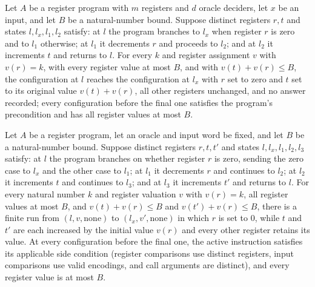 \begin{theorem}
\label{Complexity.LogProg.move_run}
\leanok
{}
Let $A$ be a register program with $m$ registers and $d$ oracle deciders, let $x$ be an
input, and let $B$ be a natural-number bound. Suppose distinct registers $r,t$ and
states $l,l_x,l_1,l_2$ satisfy: at $l$ the program branches to $l_x$ when register $r$
is zero and to $l_1$ otherwise; at $l_1$ it decrements $r$ and proceeds to $l_2$; and at
$l_2$ it increments $t$ and returns to $l$. For every $k$ and register assignment $v$
with $v(r)=k$, with every register value at most $B$, and with $v(t)+v(r)\le B$, the
configuration at $l$ reaches the configuration at $l_x$ with $r$ set to zero and $t$ set
to its original value $v(t)+v(r)$, all other registers unchanged, and no answer
recorded; every configuration before the final one satisfies the program's precondition
and has all register values at most $B$.
\end{theorem}

\begin{theorem}
\label{Complexity.LogProg.move2_run}
\leanok
{}
Let $A$ be a register program, let an oracle and input word be fixed, and let $B$ be a
natural-number bound. Suppose distinct registers $r,t,t'$ and states $l,l_x,l_1,l_2,l_3$
satisfy: at $l$ the program branches on whether register $r$ is zero, sending the zero
case to $l_x$ and the other case to $l_1$; at $l_1$ it decrements $r$ and continues to
$l_2$; at $l_2$ it increments $t$ and continues to $l_3$; and at $l_3$ it increments
$t'$ and returns to $l$. For every natural number $k$ and register valuation $v$ with
$v(r)=k$, all register values at most $B$, and $v(t)+v(r)\le B$ and $v(t')+v(r)\le B$,
there is a finite run from $(l,v,\mathrm{none})$ to $(l_x,v',\mathrm{none})$ in which
$r$ is set to $0$, while $t$ and $t'$ are each increased by the initial value $v(r)$ and
every other register retains its value. At every configuration before the final one, the
active instruction satisfies its applicable side condition (register comparisons use
distinct registers, input comparisons use valid encodings, and call arguments are
distinct), and every register value is at most $B$.
\end{theorem}

